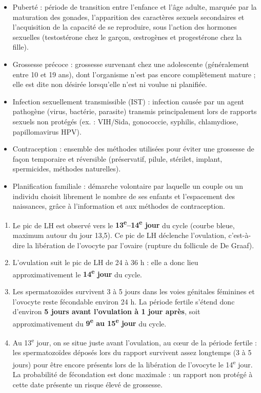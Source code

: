 \documentclass[11pt]{article}
\newcommand{\cle}[1]{{\popxbold\color{popdark}#1}}
\begin{document}
\begin{corrige}
\begin{itemize}
\item \cle{Puberté} : période de transition entre l'enfance et l'âge adulte, marquée par la maturation des gonades, l'apparition des caractères sexuels secondaires et l'acquisition de la capacité de se reproduire, sous l'action des hormones sexuelles (testostérone chez le garçon, \oe{}strogènes et progestérone chez la fille).
\item \cle{Grossesse précoce} : grossesse survenant chez une adolescente (généralement entre 10 et 19 ans), dont l'organisme n'est pas encore complètement mature ; elle est dite non désirée lorsqu'elle n'est ni voulue ni planifiée.
\item \cle{Infection sexuellement transmissible (IST)} : infection causée par un agent pathogène (virus, bactérie, parasite) transmis principalement lors de rapports sexuels non protégés (ex. : VIH/Sida, gonococcie, syphilis, chlamydiose, papillomavirus HPV).
\item \cle{Contraception} : ensemble des méthodes utilisées pour éviter une grossesse de façon temporaire et réversible (préservatif, pilule, stérilet, implant, spermicides, méthodes naturelles).
\item \cle{Planification familiale} : démarche volontaire par laquelle un couple ou un individu choisit librement le nombre de ses enfants et l'espacement des naissances, grâce à l'information et aux méthodes de contraception.
\end{itemize}
\end{corrige}

\begin{corrige}
\begin{enumerate}
\item Le pic de LH est observé vers le \textbf{13\textsuperscript{e}--14\textsuperscript{e} jour} du cycle (courbe bleue, maximum autour du jour 13,5). Ce pic de LH déclenche l'\cle{ovulation}, c'est-à-dire la libération de l'ovocyte par l'ovaire (rupture du follicule de De Graaf).
\item L'ovulation suit le pic de LH de 24 à 36 h : elle a donc lieu approximativement le \textbf{14\textsuperscript{e} jour} du cycle.
\item Les spermatozoïdes survivent 3 à 5 jours dans les voies génitales féminines et l'ovocyte reste fécondable environ 24 h. La période fertile s'étend donc d'environ \textbf{5 jours avant l'ovulation à 1 jour après}, soit approximativement du \textbf{9\textsuperscript{e} au 15\textsuperscript{e} jour} du cycle.
\item Au 13\textsuperscript{e} jour, on se situe juste avant l'ovulation, au c\oe{}ur de la période fertile : les spermatozoïdes déposés lors du rapport survivent assez longtemps (3 à 5 jours) pour être encore présents lors de la libération de l'ovocyte le 14\textsuperscript{e} jour. La probabilité de fécondation est donc maximale : un rapport non protégé à cette date présente un risque élevé de grossesse.
\end{enumerate}
\end{corrige}
\end{document}
